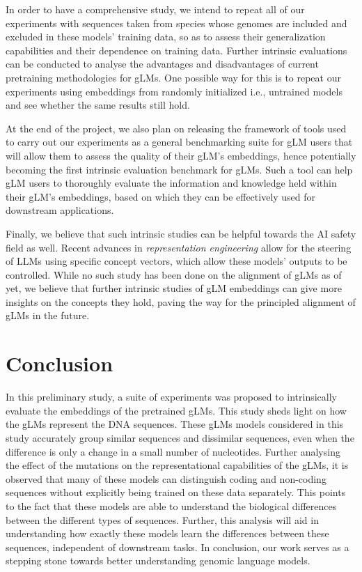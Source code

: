 \documentclass{ifacconf}
\begin{document}
In order to have a comprehensive study, we intend to repeat all of our experiments with sequences taken from species whose genomes are included and excluded in these models' training data, so as to assess their generalization capabilities and their dependence on training data. Further intrinsic evaluations can be conducted to analyse the advantages and disadvantages of current pretraining methodologies for gLMs. One possible way for this is to repeat our experiments using embeddings from randomly initialized i.e., untrained models and see whether the same results still hold.

At the end of the project, we also plan on releasing the framework of tools used to carry out our experiments as a general benchmarking suite for gLM users that will allow them to assess the quality of their gLM's embeddings, hence potentially becoming the first intrinsic evaluation benchmark for gLMs. Such a tool can help gLM users to thoroughly evaluate the information and knowledge held within their gLM's embeddings, based on which they can be effectively used for downstream applications.

Finally, we believe that such intrinsic studies can be helpful towards the AI safety field as well. Recent advances in \emph{representation engineering} allow for the steering of LLMs using specific concept vectors, which allow these models' outputs to be controlled. While no such study has been done on the alignment of gLMs as of yet, we believe that further intrinsic studies of gLM embeddings can give more insights on the concepts they hold, paving the way for the principled alignment of gLMs in the future.

\section{Conclusion}

In this preliminary study, a suite of experiments was proposed to intrinsically evaluate the embeddings of the pretrained gLMs. This study sheds light on how the gLMs represent the DNA sequences. These gLMs models considered in this study accurately group similar sequences and dissimilar sequences, even when the difference is only a change in a small number of nucleotides. Further analysing the effect of the mutations on the representational capabilities of the gLMs, it is observed that many of these models can distinguish coding and non-coding sequences without explicitly being trained on these data separately. This points to the fact that these models are able to understand the biological differences between the different types of sequences. Further, this analysis will aid in understanding how exactly these models learn the differences between these sequences, independent of downstream tasks. In conclusion, our work serves as a stepping stone towards better understanding genomic language models.
\end{document}
